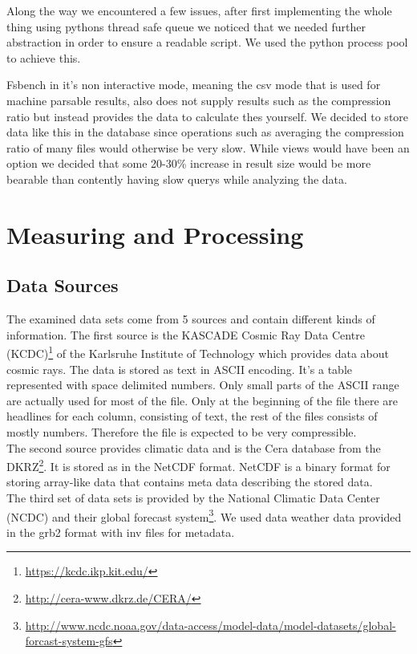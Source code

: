 \documentclass[
	12pt,
	a4paper,
	BCOR10mm,
	DIV14,
	listof=totoc,
	bibliography=totoc,
	headsepline
]{scrreprt}
\begin{document}
Along the way we encountered a few issues, after first implementing the whole thing using pythons thread safe queue we noticed that we needed further abstraction in order to ensure a readable script. We used the python process pool to achieve this.

Fsbench in it's non interactive mode, meaning the csv mode that is used for machine parsable results, also does not supply results such as the compression ratio but instead provides the data to calculate thes yourself. We decided to store data like this in the database since operations such as averaging the compression ratio of many files would otherwise be very slow.
While views would have been an option we decided that some 20-30\% increase in result size would be more bearable than contently having slow querys while analyzing the data.

\chapter{Measuring and Processing}
\label{Measuring and Processing}
\section{Data Sources}
The examined data sets come from 5 sources and contain different kinds of information.
The first source is the KASCADE Cosmic Ray Data Centre (KCDC)\footnote{\url{https://kcdc.ikp.kit.edu/}} of the Karlsruhe Institute of Technology which provides data about cosmic rays. 
The data is stored as text in ASCII encoding. 
It's a table represented with space delimited numbers. Only small parts of the ASCII range are actually used for most of the file. Only at the beginning of the file there are headlines for each column, consisting of text, the rest of the files consists of mostly numbers.
Therefore the file is expected to be very compressible.
\\

The second source provides climatic data and is the Cera database from the DKRZ\footnote{\url{http://cera-www.dkrz.de/CERA/}}. 
It is stored as in the NetCDF format.
NetCDF is a binary format for storing array-like data that contains meta data describing the stored data.
\\

The third set of data sets is provided by the National Climatic Data Center (NCDC) and their global forecast system\footnote{\url{http://www.ncdc.noaa.gov/data-access/model-data/model-datasets/global-forcast-system-gfs}}. 
We used data weather data provided in the grb2 format with inv files for metadata. 
\\
\end{document}
